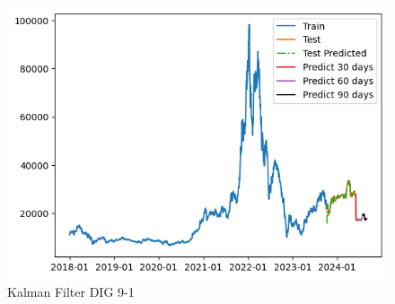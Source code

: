\documentclass[conference]{IEEEtran}
\begin{document}
\begin{enumerate}
\begin{figure}[htbp]
\begin{minipage}{0.23\textwidth}
    \centering
    \includegraphics[width=1\textwidth]{experiment/kf/DIG 9-1.png}
    \caption{Kalman Filter DIG 9-1}
    \label{fig:nvl_histogram}
    \end{minipage}

    \vspace{0.5cm} %


\end{figure}
\end{enumerate}
\end{document}
